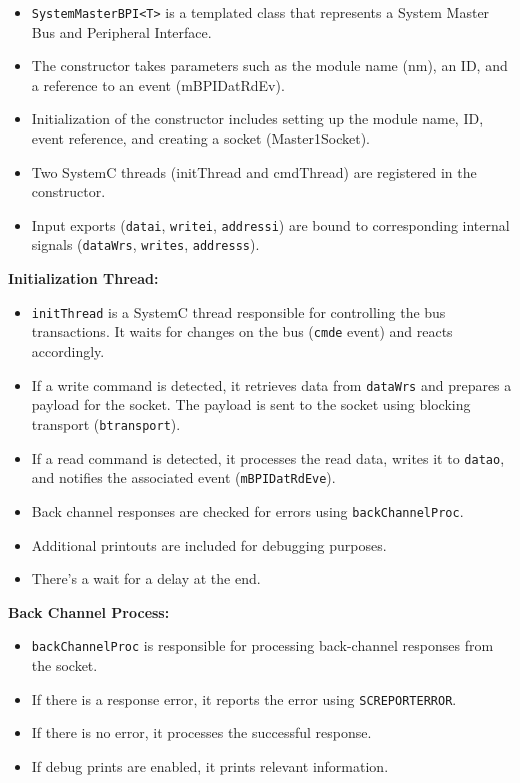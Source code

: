 \documentclass[a4paper,12pt,english]{report}
\begin{document}
\begin{itemize}
\item \texttt{SystemMasterBPI\textless T\textgreater} is a templated class that represents a System Master Bus and Peripheral Interface.
\item The constructor takes parameters such as the module name (nm), an ID, and a reference to an event (mBPIDatRdEv).
\item Initialization of the constructor includes setting up the module name, ID, event reference, and creating a socket (Master1Socket).
\item Two SystemC threads (initThread and cmdThread) are registered in the constructor.
\item Input exports (\texttt{data\textunderscore i}, \texttt{write\textunderscore i}, \texttt{address\textunderscore i}) are bound to corresponding internal signals (\texttt{dataWr\textunderscore s}, \texttt{write\textunderscore s}, \texttt{address\textunderscore s}).
\end{itemize}
\textbf{Initialization Thread:} 
\begin{itemize}
\item \texttt{initThread} is a SystemC thread responsible for controlling the bus transactions. It waits for changes on the bus (\texttt{cmd\textunderscore e} event) and reacts accordingly.

    \item If a write command is detected, it retrieves data from \texttt{dataWr\textunderscore s} and prepares a payload for the socket. The payload is sent to the socket using blocking transport (\texttt{b\textunderscore transport}).

    \item If a read command is detected, it processes the read data, writes it to \texttt{data\textunderscore o}, and notifies the associated event (\texttt{mBPIDatRdEv\textunderscore e}).

    \item Back channel responses are checked for errors using \texttt{backChannelProc}.

    \item Additional printouts are included for debugging purposes.

    \item There's a wait for a delay at the end.
\end{itemize}

\textbf{Back Channel Process:}
\begin{itemize}
\item \texttt{backChannelProc} is responsible for processing back-channel responses from the socket.

    \item If there is a response error, it reports the error using \texttt{SC\textunderscore REPORT\textunderscore ERROR}.

    \item If there is no error, it processes the successful response.

    \item If debug prints are enabled, it prints relevant information.
\end{itemize}
\end{document}
